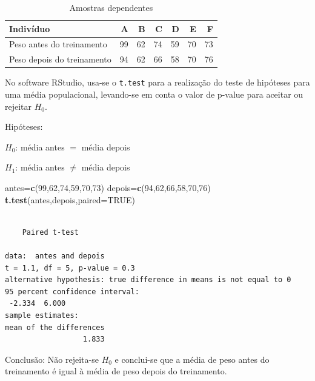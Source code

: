 \documentclass[12pt,brazil,oneside]{book}
\newenvironment{Shaded}{\begin{snugshade}}{\end{snugshade}}
\newcommand{\DataTypeTok}[1]{\textcolor[rgb]{0.13,0.29,0.53}{#1}}
\newcommand{\DecValTok}[1]{\textcolor[rgb]{0.00,0.00,0.81}{#1}}
\newcommand{\KeywordTok}[1]{\textcolor[rgb]{0.13,0.29,0.53}{\textbf{#1}}}
\newcommand{\NormalTok}[1]{#1}
\newcommand{\OtherTok}[1]{\textcolor[rgb]{0.56,0.35,0.01}{#1}}
\begin{document}
\begin{table}[t]

\caption{\label{tab:unnamed-chunk-117}Amostras dependentes}
\centering
\begin{tabular}{l|r|r|r|r|r|r}
\hline
Indivíduo & A & B & C & D & E & F\\
\hline
Peso antes do treinamento & 99 & 62 & 74 & 59 & 70 & 73\\
\hline
Peso depois do treinamento & 94 & 62 & 66 & 58 & 70 & 76\\
\hline
\end{tabular}
\end{table}

No software RStudio, usa-se o \texttt{t.test} para a realização do teste de hipóteses para uma média populacional, levando-se em conta o valor de p-value para aceitar ou rejeitar \(H_0\).

Hipóteses:

\textbf{\(H_0\)}: média antes \(=\) média depois

\textbf{\(H_1\)}: média antes \(\neq\) média depois

\begin{Shaded}
\begin{Highlighting}[]
\NormalTok{antes=}\KeywordTok{c}\NormalTok{(}\DecValTok{99}\NormalTok{,}\DecValTok{62}\NormalTok{,}\DecValTok{74}\NormalTok{,}\DecValTok{59}\NormalTok{,}\DecValTok{70}\NormalTok{,}\DecValTok{73}\NormalTok{)}
\NormalTok{depois=}\KeywordTok{c}\NormalTok{(}\DecValTok{94}\NormalTok{,}\DecValTok{62}\NormalTok{,}\DecValTok{66}\NormalTok{,}\DecValTok{58}\NormalTok{,}\DecValTok{70}\NormalTok{,}\DecValTok{76}\NormalTok{)}
\KeywordTok{t.test}\NormalTok{(antes,depois,}\DataTypeTok{paired=}\OtherTok{TRUE}\NormalTok{)}
\end{Highlighting}
\end{Shaded}

\begin{verbatim}

    Paired t-test

data:  antes and depois
t = 1.1, df = 5, p-value = 0.3
alternative hypothesis: true difference in means is not equal to 0
95 percent confidence interval:
 -2.334  6.000
sample estimates:
mean of the differences 
                  1.833 
\end{verbatim}

Conclusão: Não rejeita-se \(H_0\) e conclui-se que a média de peso antes do treinamento é igual à média de peso depois do treinamento.
\end{document}
